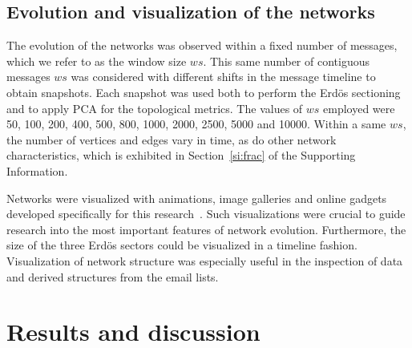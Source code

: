 \documentclass[%
	aip,
	jmp,%
	amsmath,amssymb,
	reprint,%
]{revtex4-1}
\begin{document}
\subsection{Evolution and visualization of the networks}\label{sec:viz}
The evolution of the networks was observed within a fixed number of messages, which we refer to as the window size $ws$. This same number of contiguous messages $ws$ was considered with different shifts in the message timeline to obtain snapshots. Each snapshot was used both to perform the Erd\"os sectioning and to apply PCA for the topological metrics.  
The values of $ws$ employed were 50, 100, 200, 400, 500, 800, 1000, 2000, 2500, 5000 and 10000. Within a same $ws$, the number of vertices and edges vary in time, as do other network characteristics, which is exhibited in Section~\ref{si:frac} of the Supporting Information. 

Networks were visualized with animations, image galleries and online gadgets developed specifically for this research~\cite{animacoes,galGMANE,appGMANE}. Such visualizations were crucial to guide research into the most important features of network evolution. Furthermore, the size of the three Erd\"os sectors could be visualized in a timeline fashion. Visualization of network structure was especially useful in the inspection of data and derived structures from the email lists.

\section{Results and discussion}\label{sec:results}
\end{document}

